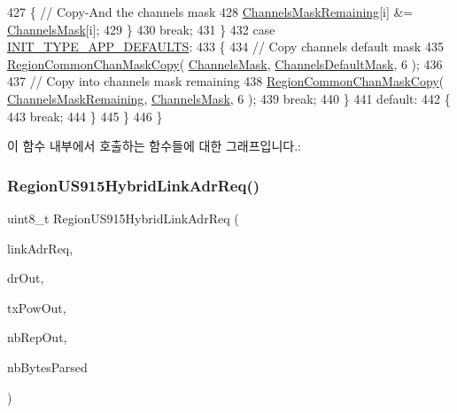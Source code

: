 \begin{DoxyCode}
427             \{ \textcolor{comment}{// Copy-And the channels mask}
428                 \mbox{\hyperlink{_region_u_s915-_hybrid_8c_a567333cec639a004655cc1717e9d0928}{ChannelsMaskRemaining}}[i] &= \mbox{\hyperlink{_region_u_s915-_hybrid_8c_a2188957b5ca6af8092154d7ccbfa5757}{ChannelsMask}}[i];
429             \}
430             \textcolor{keywordflow}{break};
431         \}
432         \textcolor{keywordflow}{case} \mbox{\hyperlink{group___r_e_g_i_o_n_gga11ecad794560a3d3961bdf1c9a27d3b2a3d260b94611dd833c5243c16ca26c3f0}{INIT\_TYPE\_APP\_DEFAULTS}}:
433         \{
434             \textcolor{comment}{// Copy channels default mask}
435             \mbox{\hyperlink{group___r_e_g_i_o_n_c_o_m_m_o_n_ga95f5199d490113269fae7f2e0569e9a0}{RegionCommonChanMaskCopy}}( \mbox{\hyperlink{_region_u_s915-_hybrid_8c_a2188957b5ca6af8092154d7ccbfa5757}{ChannelsMask}}, 
      \mbox{\hyperlink{_region_u_s915-_hybrid_8c_ac127b19779301713d5ed92eb03366a2d}{ChannelsDefaultMask}}, 6 );
436 
437             \textcolor{comment}{// Copy into channels mask remaining}
438             \mbox{\hyperlink{group___r_e_g_i_o_n_c_o_m_m_o_n_ga95f5199d490113269fae7f2e0569e9a0}{RegionCommonChanMaskCopy}}( 
      \mbox{\hyperlink{_region_u_s915-_hybrid_8c_a567333cec639a004655cc1717e9d0928}{ChannelsMaskRemaining}}, \mbox{\hyperlink{_region_u_s915-_hybrid_8c_a2188957b5ca6af8092154d7ccbfa5757}{ChannelsMask}}, 6 );
439             \textcolor{keywordflow}{break};
440         \}
441         \textcolor{keywordflow}{default}:
442         \{
443             \textcolor{keywordflow}{break};
444         \}
445     \}
446 \}
\end{DoxyCode}
이 함수 내부에서 호출하는 함수들에 대한 그래프입니다.\+:
\mbox{\label{group___r_e_g_i_o_n_u_s915_h_y_b_gade4dc50b11235e0a6675b0d22240dea2}} 
\subsubsection{\texorpdfstring{Region\+U\+S915\+Hybrid\+Link\+Adr\+Req()}{RegionUS915HybridLinkAdrReq()}}
{\footnotesize\ttfamily uint8\+\_\+t Region\+U\+S915\+Hybrid\+Link\+Adr\+Req (\begin{DoxyParamCaption}\item[{\mbox{\hyperlink{group___r_e_g_i_o_n_gad4af503e8d4de1846129e26a799a1e8e}{Link\+Adr\+Req\+Params\+\_\+t}} $\ast$}]{link\+Adr\+Req,  }\item[{int8\+\_\+t $\ast$}]{dr\+Out,  }\item[{int8\+\_\+t $\ast$}]{tx\+Pow\+Out,  }\item[{uint8\+\_\+t $\ast$}]{nb\+Rep\+Out,  }\item[{uint8\+\_\+t $\ast$}]{nb\+Bytes\+Parsed }\end{DoxyParamCaption})}



